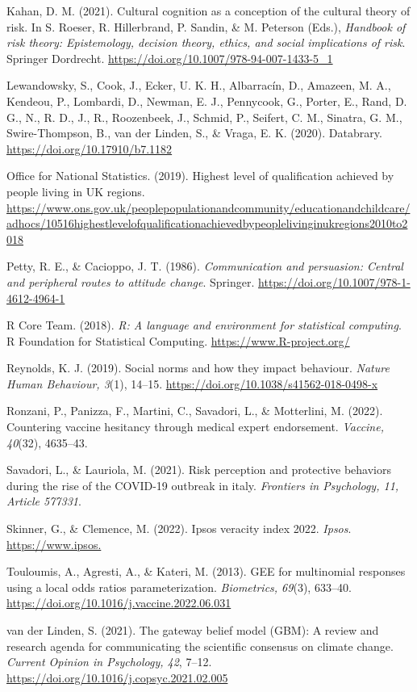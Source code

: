 \documentclass[authordate, empirical]{jote-new-article}
\begin{document}
Kahan, D. M. (2021). Cultural cognition as a conception of the cultural theory of risk. In S. Roeser, R. Hillerbrand, P. Sandin, \& M. Peterson (Eds.), \emph{Handbook of risk theory: Epistemology, decision theory, ethics, and social implications of risk}. Springer Dordrecht. \url{https://doi.org/10.1007/978-94-007-1433-5\_1}

Lewandowsky, S., Cook, J., Ecker, U. K. H., Albarracín, D., Amazeen, M. A., Kendeou, P., Lombardi, D., Newman, E. J., Pennycook, G., Porter, E., Rand, D. G., N., R. D., J., R., Roozenbeek, J., Schmid, P., Seifert, C. M., Sinatra, G. M., Swire-Thompson, B., van der Linden, S., \& Vraga, E. K. (2020). Databrary. \url{https://doi.org/10.17910/b7.1182}

Office for National Statistics. (2019). Highest level of qualification achieved by people living in UK regions. \url{https://www.ons.gov.uk/peoplepopulationandcommunity/educationandchildcare/adhocs/10516highestlevelofqualificationachievedbypeoplelivinginukregions2010to2018}

Petty, R. E., \& Cacioppo, J. T. (1986). \emph{Communication and persuasion: Central and peripheral routes to
attitude change}. Springer. \url{https://doi.org/10.1007/978-1-4612-4964-1}

R Core Team. (2018). \emph{R: A language and environment for statistical computing}. R Foundation for Statistical Computing. \url{https://www.R-project.org/}

Reynolds, K. J. (2019). Social norms and how they impact behaviour. \emph{Nature Human Behaviour, 3}(1), 14–15. \url{https://doi.org/10.1038/s41562-018-0498-x}

Ronzani, P., Panizza, F., Martini, C., Savadori, L., \& Motterlini, M. (2022). Countering vaccine hesitancy through medical expert endorsement. \emph{Vaccine, 40}(32), 4635–43.

Savadori, L., \& Lauriola, M. (2021). Risk perception and protective behaviors during the rise of the COVID-19 outbreak in italy. \emph{Frontiers in Psychology, 11, Article 577331}.

Skinner, G., \& Clemence, M. (2022). Ipsos veracity index 2022. \emph{Ipsos}. \url{https://www.ipsos.}

Touloumis, A., Agresti, A., \& Kateri, M. (2013). GEE for multinomial responses using a local odds ratios parameterization. \emph{Biometrics, 69}(3), 633–40. \url{https://doi.org/10.1016/j.vaccine.2022.06.031}

van der Linden, S. (2021). The gateway belief model (GBM): A review and research agenda for communicating the scientific consensus on climate change. \emph{Current Opinion in Psychology, 42}, 7–12. \url{https://doi.org/10.1016/j.copsyc.2021.02.005}
\end{document}
